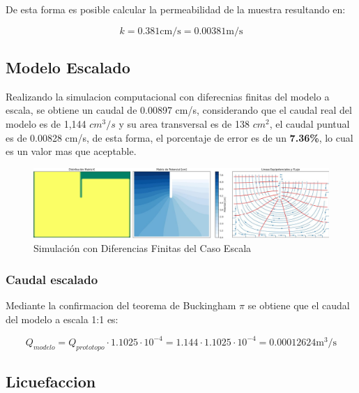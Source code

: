 De esta forma es posible calcular la permeabilidad de la muestra resultando en:

\begin{equation}
    k = 0.381 \text{cm/s} = 0.00381 \text{m/s}
\end{equation}

\subsection{Modelo Escalado}

Realizando la simulacion computacional con diferecnias finitas del modelo a escala, se obtiene un caudal de 0.00897 cm/s, considerando que el caudal real del modelo es de 1,144 $cm^3/s$ y su area transversal es de 138 $cm^2$, el caudal puntual
es de 0.00828 cm/s, de esta forma, el porcentaje de error es de un \textbf{7.36\%}, lo cual es un valor mas que aceptable.

\begin{figure}[H]
    \centering
    \includegraphics[width=1\textwidth]{GRAFICOS/laplace_escala_cm.jpg}
    \caption{Simulación con Diferencias Finitas del Caso Escala}
    \label{fig:maqueta_caso_1}
\end{figure}

\subsubsection{Caudal escalado}

Mediante la confirmacion del teorema de Buckingham $\pi$ se obtiene que el caudal del modelo a escala 1:1 es:

\begin{equation}
    Q_{modelo} = Q_{prototopo} \cdot 1.1025 \cdot 10^{-4} = 1.144 \cdot 1.1025 \cdot 10^{-4} = 0.00012624 \text{m}^3/\text{s}
\end{equation}



\newpage
\subsection{Licuefaccion}

